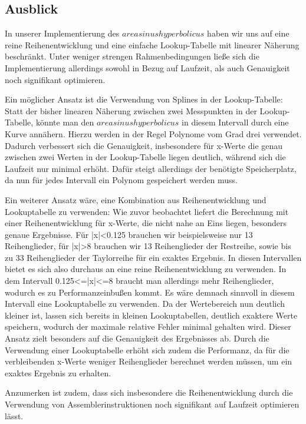 \documentclass[course=erap] {aspdoc}
\begin{document}
    \subsection{Ausblick}

    In unserer Implementierung des $areasinus hyperbolicus$ haben wir uns auf eine reine Reihenentwicklung und eine einfache Lookup-Tabelle mit linearer Näherung beschränkt.
    Unter weniger strengen Rahmenbedingungen ließe sich die Implementierung allerdings sowohl in Bezug auf Laufzeit, als auch Genauigkeit noch signifikant optimieren. 
    
    Ein möglicher Ansatz ist die Verwendung von Splines in der Lookup-Tabelle: Statt der bisher linearen Näherung zwischen zwei Messpunkten in der Lookup-Tabelle, könnte man den $areasinus hyperbolicus$ in diesem Intervall durch eine Kurve annähern.
    Hierzu werden in der Regel Polynome vom Grad drei verwendet.
    Dadurch verbessert sich die Genauigkeit, insbesondere für x-Werte die genau zwischen zwei Werten in der Lookup-Tabelle liegen deutlich, während sich die Laufzeit nur minimal erhöht.
    Dafür steigt allerdings der benötigte Speicherplatz, da nun für jedes Intervall ein Polynom gespeichert werden muss.

     Ein weiterer Ansatz wäre, eine Kombination aus Reihenentwicklung und Lookuptabelle zu verwenden: 
    Wie zuvor beobachtet liefert die Berechnung mit einer Reihenentwicklung für x-Werte, die nicht nahe an Eins liegen, besonders genaue Ergebnisse. Für |x|<0.125 brauchen wir beispielsweise nur 13 Reihenglieder, für |x|>8 brauchen wir 13 Reihenglieder der Restreihe, sowie bis zu 33 Reihenglieder der Taylorreihe für ein exaktes Ergebnis. In diesen Intervallen bietet es sich also durchaus an eine reine Reihenentwicklung zu verwenden. In dem Intervall 0.125<=|x|<=8 braucht man allerdings mehr Reihenglieder, wodurch es zu Performanzeinbußen kommt. Es wäre demnach sinnvoll in diesem Intervall eine Lookuptabelle zu verwenden. Da der Wertebereich nun deutlich kleiner ist, lassen sich bereits in kleinen Lookuptabellen, deutlich exaktere Werte speichern, wodurch der maximale relative Fehler minimal gehalten wird. Dieser Ansatz zielt besonders auf die Genauigkeit des Ergebnisses ab. Durch die Verwendung einer Lookuptabelle erhöht sich zudem die Performanz, da für die verbleibenden x-Werte weniger Reihenglieder berechnet werden müssen, um ein exaktes Ergebnis zu erhalten. 

    Anzumerken ist zudem, dass sich insbesondere die Reihenentwicklung durch die Verwendung von Assemblerinstruktionen noch signifikant auf Laufzeit optimieren lässt. 

    
    
\end{document}
